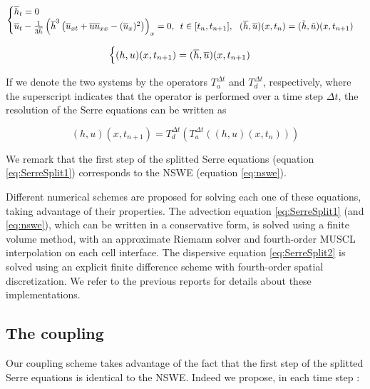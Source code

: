\begin{equation}
\label{eq:SerreSplit2}
\begin{cases}
\lh_t   = 0 \\
\lu_t - \frac{1}{3\lh}\left(\lh^3 \left( \lu_{xt} + \lu\lu_{xx} - (\lu_x)^2  \right) \right)_x = 0, \ \, t \in [t_n, t_{n+1}], \ \  (\lh,\lu)(x,t_n) = (\th,\tu)(x,t_{n+1})
\end{cases}
\end{equation}

\begin{equation}
\begin{cases}
(h,u)(x,t_{n+1}) = (\overline{h},\overline{u})(x,t_{n+1})
\end{cases}
\end{equation}

\indent If we denote the two systems by the operators $T_a^{\Delta t}$ and $T_d^{\Delta t}$, respectively, where the superscript indicates that the operator is performed over a time step $\Delta t$, the resolution of the Serre equations can be written as

\begin{equation}
(h,u)(x,t_{n+1}) = T_d^{\Delta t} \left( T_a^{\Delta t} \left((h,u)(x,t_n) \right) \right)
\end{equation}

\indent We remark that the first step of the splitted Serre equations (equation \ref{eq:SerreSplit1}) corresponds to the NSWE (equation \ref{eq:nswe}).

\indent Different numerical schemes are proposed for solving each one of these equations, taking advantage of their properties. The advection equation \eqref{eq:SerreSplit1} (and \ref{eq:nswe}), which can be written in a conservative form, is solved using a finite volume method, with an approximate Riemann solver and fourth-order MUSCL interpolation on each cell interface. The dispersive equation \eqref{eq:SerreSplit2} is solved using an explicit finite difference scheme with fourth-order spatial discretization. We refer to the previous reports for details about these implementations.

\subsection{The coupling}

\indent Our coupling scheme takes advantage of the fact that the first step of the splitted Serre equations is identical to the NSWE. Indeed we propose, in each time step :

